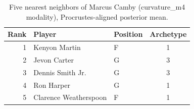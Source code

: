 \begin{table}[htbp]
  \centering\small
  \begin{tabular}{rllc}
    \toprule
    Rank & Player & Position & Archetype \\
    \midrule
    1 & Kenyon Martin & F & 1 \\
    2 & Jevon Carter & G & 3 \\
    3 & Dennis Smith Jr. & G & 3 \\
    4 & Ron Harper & G & 1 \\
    5 & Clarence Weatherspoon & F & 1 \\
    \bottomrule
  \end{tabular}
  \caption{Five nearest neighbors of Marcus Camby (curvature_m4 modality), Procrustes-aligned posterior mean.}
  \label{tab:Marcus_Camby_neighbors_curvature_m4}
\end{table}

